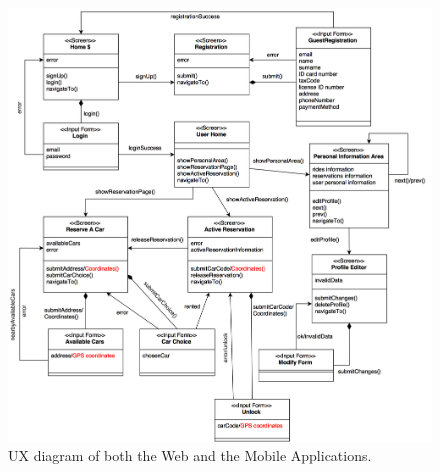 \begin{figure}[H]
\begin{center}
		\includegraphics[width=\textwidth]{./user_interface_design/diagrams/web_mobile_ux.png}
		\caption{UX diagram of both the Web and the Mobile Applications.}
		\label{web_mobile_ux}
\end{center}
\end{figure}